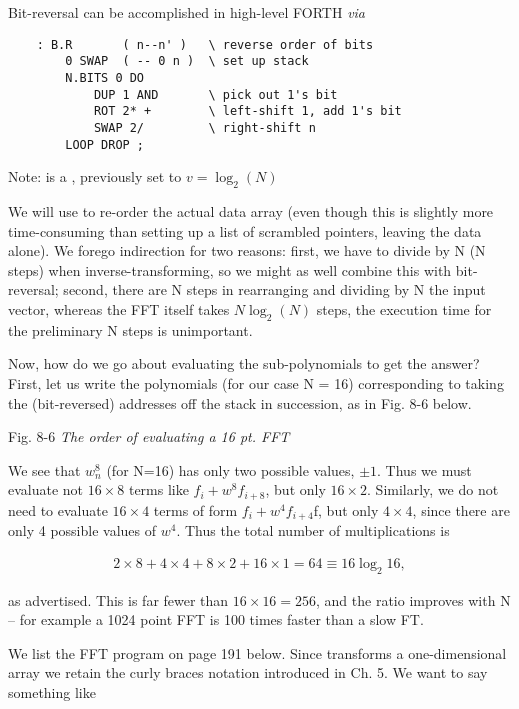 Bit-reversal can be accomplished in high-level FORTH \textit{via}

\begin{lstlisting}
    : B.R       ( n--n' )   \ reverse order of bits
        0 SWAP  ( -- 0 n )  \ set up stack
        N.BITS 0 DO
            DUP 1 AND       \ pick out 1's bit
            ROT 2* +        \ left-shift 1, add 1's bit
            SWAP 2/         \ right-shift n
        LOOP DROP ;
\end{lstlisting}

\leftbar[1\linewidth]
Note:  is a , previously set to $v = \log_{2}(N)$
\endleftbar

We will use  to re-order the actual data array (even though this is slightly more time-consuming than setting up a list of scrambled pointers, leaving the data alone). We forego indirection for two reasons: first, we have to divide by N (N steps) when inverse-transforming, so we might as well combine this with bit-reversal; second, there are N steps in rearranging and dividing by N the input vector, whereas the FFT itself takes $N\log_{2}(N)$ steps, \ie the execution time for the preliminary N steps is unimportant.

Now, how do we go about evaluating the sub-polynomials to get the answer? First, let us write the polynomials (for our case N = 16) corresponding to taking the (bit-reversed) addresses off the stack in succession, as in Fig. 8-6 below.

Fig. 8-6 \textit{The order of evaluating a 16 pt. FFT}

We see that $w_{n}^{8}$ (for N=16) has only two possible values, $\pm1$. Thus we must evaluate not $16\times8$ terms like $f_{i} + w^{8}f_{i+8}$, but only $16\times2$. Similarly, we do not need to evaluate $16\times4$ terms of form $f_{i} + w^{4}f_{i+4}$f, but only $4\times4$, since there are only 4 possible values of $w^{4}$. Thus the total number of multiplications is

\begin{align*}
    2\times8 + 4\times4 + 8\times2 + 16\times1 = 64 \equiv 16\log_{2}16,
\end{align*}

as advertised. This is far fewer than $16\times16=256$, and the ratio improves with N -- for example a 1024 point FFT is 100 times faster than a slow FT.

We list the FFT program on page 191 below. Since  transforms a one-dimensional array we retain the curly braces notation introduced in Ch. 5. We want to say something like

